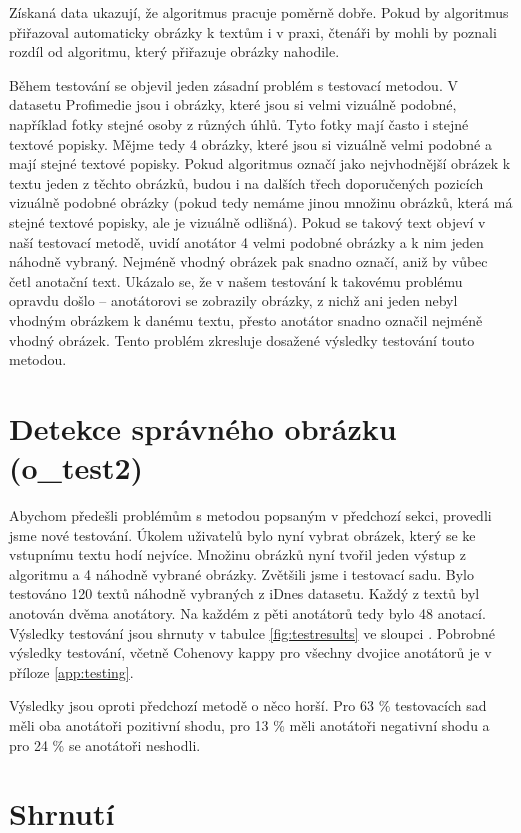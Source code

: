 Získaná data ukazují, že algoritmus pracuje poměrně dobře. Pokud by algoritmus přiřazoval automaticky obrázky k textům i v praxi, čtenáři by mohli by poznali rozdíl od algoritmu, který přiřazuje obrázky nahodile.

Během testování se objevil jeden zásadní problém s testovací metodou. V datasetu Profimedie jsou i obrázky, které jsou si velmi vizuálně podobné, například fotky stejné osoby z různých úhlů. Tyto fotky mají často i stejné textové popisky. Mějme tedy 4 obrázky, které jsou si vizuálně velmi podobné a mají stejné textové popisky. Pokud algoritmus označí jako nejvhodnější obrázek k textu jeden z těchto obrázků, budou i na dalších třech doporučených pozicích vizuálně podobné obrázky (pokud tedy nemáme jinou množinu obrázků, která má stejné textové popisky, ale je vizuálně odlišná). Pokud se takový text objeví v naší testovací metodě, uvidí anotátor 4 velmi podobné obrázky a k nim jeden náhodně vybraný. Nejméně vhodný obrázek pak snadno označí, aniž by vůbec četl anotační text. Ukázalo se, že v našem testování k takovému problému opravdu došlo -- anotátorovi se zobrazily obrázky, z nichž ani jeden nebyl vhodným obrázkem k danému textu, přesto anotátor snadno označil nejméně vhodný obrázek. Tento problém zkresluje dosažené výsledky testování touto metodou.

\section{Detekce správného obrázku (o\_test2)}

Abychom předešli problémům s metodou popsaným v předchozí sekci, provedli jsme nové testování. Úkolem uživatelů bylo nyní vybrat obrázek, který se ke vstupnímu textu hodí nejvíce. Množinu obrázků nyní tvořil jeden výstup z algoritmu a 4 náhodně vybrané obrázky. Zvětšili jsme i testovací sadu. Bylo testováno 120 textů náhodně vybraných z iDnes datasetu. Každý z textů byl anotován dvěma anotátory. Na každém z pěti anotátorů tedy bylo 48 anotací. Výsledky testování jsou shrnuty v tabulce \ref{fig:testresults} ve sloupci . Pobrobné výsledky testování, včetně Cohenovy kappy pro všechny dvojice anotátorů je v příloze \ref{app:testing}.

Výsledky jsou oproti předchozí metodě o něco horší. Pro 63 \% testovacích sad měli oba anotátoři pozitivní shodu, pro 13 \% měli anotátoři negativní shodu a pro 24 \% se anotátoři neshodli.

\section{Shrnutí}

